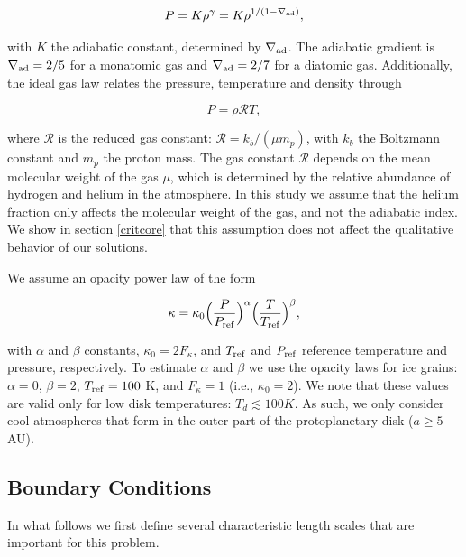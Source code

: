 \documentclass[apj]{emulateapj}
\newcommand{\delad}{\nabla_{\rm ad}}
\begin{document}
\begin{equation}
\label{eq:polyEOS}
P=K \rho^{\gamma}=K \rho^{1/(1-\delad)},
\end{equation}

\noindent with $K$ the adiabatic constant, determined by $\delad$. The adiabatic gradient is $\delad=2/5$ for a monatomic gas and $\delad=2/7$ for a diatomic gas. Additionally, the ideal gas law relates the pressure, temperature and density through

\begin{equation}
\label{eq:idealgas}
P=\rho \mathcal{R} T,
\end{equation}

\noindent where  $\mathcal{R}$ is the reduced gas constant: $\mathcal{R}=k_b/(\mu m_p)$, with $k_b$ the Boltzmann constant and $m_p$ the proton mass. The gas constant $\mathcal{R}$ depends on the mean molecular weight of the gas $\mu$, which is determined by the relative abundance of hydrogen and helium in the atmosphere. In this study we assume that the helium fraction only affects the molecular weight of the gas, and not the adiabatic index. We show in section \ref{critcore} that this assumption does not affect the qualitative behavior of our solutions.

We assume an opacity power law of the form

\begin{equation}
\label{eq:opacitylaw}
\kappa=\kappa_0 \Big(\frac{P}{P_{\rm{ref}}}\Big)^{\alpha} \Big(\frac{T}{T_{\rm{ref}}}\Big)^{\beta},
\end{equation}  

\noindent with $\alpha$ and $\beta$ constants, $\kappa_0=2 F_{\kappa}$, and $T_{\rm{ref}}$ and $P_{\rm{ref}}$ reference temperature and pressure, respectively. To estimate $\alpha$ and $\beta$ we use the \citet{bell94} opacity laws for ice grains: $\alpha =0 $, $\beta=2$, $T_{\rm{ref}}=100$ K, and $F_{\kappa}=1$ (i.e., $\kappa_0=2$). We note that these values are valid only for low disk temperatures: $T_d \lesssim 100 K$. As such, we only consider cool atmospheres that form in the outer part of the protoplanetary disk ($a \geq 5$ AU).

\subsection{Boundary Conditions}
\label{BCs}


In what follows we first define several characteristic length scales that are important for this problem. \\
\end{document}
